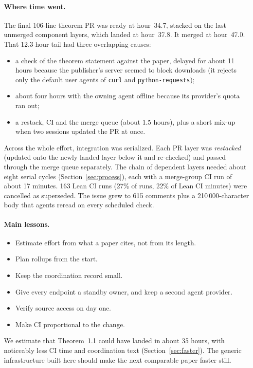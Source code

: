 \documentclass[11pt]{article}
\newcommand{\code}[1]{\texttt{\small #1}}
\begin{document}
\paragraph{Where time went.} The final 106-line theorem PR was ready at hour~34.7, stacked on the
last unmerged component layers, which landed at hour~37.8. It merged at hour~47.0. That 12.3-hour tail had three overlapping causes:
\begin{itemize}
\item a check of the theorem statement against the paper, delayed for about 11 hours because the
publisher's server seemed to block downloads (it rejects only the default user agents of
\code{curl} and \code{python-requests});
\item about four hours with the owning agent offline because its provider's quota ran out;
\item a restack, CI and the merge queue (about 1.5 hours), plus a short mix-up when two
sessions updated the PR at once.
\end{itemize}
Across the whole effort, integration was serialized. Each PR layer was \emph{restacked}
(updated onto the newly landed layer below it and re-checked) and passed through the merge
queue separately. The chain of dependent layers needed about eight serial cycles (Section~\ref{sec:process}), each with a merge-group CI run of about 17 minutes. 163 Lean CI runs (27\%
of runs, 22\% of Lean CI minutes) were cancelled as superseded. The issue grew to 615 comments
plus a 210\,000-character body that agents reread on every scheduled check.

\paragraph{Main lessons.}
\begin{itemize}
\item Estimate effort from what a paper cites, not from its length.
\item Plan rollups from the start.
\item Keep the coordination record small.
\item Give every endpoint a standby owner, and keep a second agent provider.
\item Verify source access on day one.
\item Make CI proportional to the change.
\end{itemize}
We estimate that Theorem~1.1 could have landed in about 35 hours, with noticeably less CI time
and coordination text (Section~\ref{sec:faster}). The generic infrastructure built here should make the next
comparable paper faster still.
\end{document}

